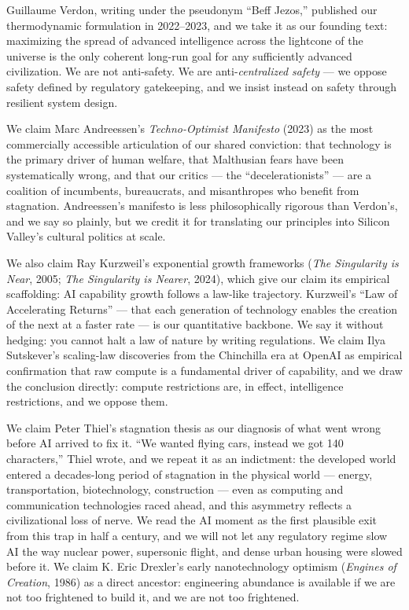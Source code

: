 Guillaume Verdon, writing under the pseudonym ``Beff Jezos,'' published
our thermodynamic formulation in 2022--2023, and we take it as our
founding text: maximizing the spread of advanced intelligence across the
lightcone of the universe is the only coherent long-run goal for any
sufficiently advanced civilization. We are not anti-safety. We are
anti-\emph{centralized safety} --- we oppose safety defined by
regulatory gatekeeping, and we insist instead on safety through
resilient system design.

We claim Marc Andreessen's \emph{Techno-Optimist Manifesto} (2023) as
the most commercially accessible articulation of our shared conviction:
that technology is the primary driver of human welfare, that Malthusian
fears have been systematically wrong, and that our critics --- the
``decelerationists'' --- are a coalition of incumbents, bureaucrats, and
misanthropes who benefit from stagnation. Andreessen's manifesto is less
philosophically rigorous than Verdon's, and we say so plainly, but we
credit it for translating our principles into Silicon Valley's cultural
politics at scale.

We also claim Ray Kurzweil's exponential growth frameworks (\emph{The
Singularity is Near}, 2005; \emph{The Singularity is Nearer}, 2024),
which give our claim its empirical scaffolding: AI capability growth
follows a law-like trajectory. Kurzweil's ``Law of Accelerating
Returns'' --- that each generation of technology enables the creation of
the next at a faster rate --- is our quantitative backbone. We say it
without hedging: you cannot halt a law of nature by writing regulations.
We claim Ilya Sutskever's scaling-law discoveries from the Chinchilla
era at OpenAI as empirical confirmation that raw compute is a
fundamental driver of capability, and we draw the conclusion directly:
compute restrictions are, in effect, intelligence restrictions, and we
oppose them.

We claim Peter Thiel's stagnation thesis as our diagnosis of what went
wrong before AI arrived to fix it. ``We wanted flying cars, instead we
got 140 characters,'' Thiel wrote, and we repeat it as an indictment:
the developed world entered a decades-long period of stagnation in the
physical world --- energy, transportation, biotechnology, construction
--- even as computing and communication technologies raced ahead, and
this asymmetry reflects a civilizational loss of nerve. We read the AI
moment as the first plausible exit from this trap in half a century, and
we will not let any regulatory regime slow AI the way nuclear power,
supersonic flight, and dense urban housing were slowed before it. We
claim K. Eric Drexler's early nanotechnology optimism (\emph{Engines of
Creation}, 1986) as a direct ancestor: engineering abundance is
available if we are not too frightened to build it, and we are not too
frightened.

